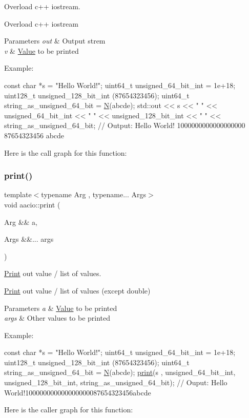 Overload c++ iostream. 

Overload c++ iostream 
\begin{DoxyParams}{Parameters}
{\em out} & Output strem \\
\hline
{\em v} & \mbox{\hyperlink{struct_value}{Value}} to be printed\\
\hline
\end{DoxyParams}
Example\+: 
\begin{DoxyCode}
\textcolor{keyword}{const} \textcolor{keywordtype}{char} *s = \textcolor{stringliteral}{"Hello World!"};
uint64\_t unsigned\_64\_bit\_int = 1e+18;
uint128\_t unsigned\_128\_bit\_int (87654323456);
uint64\_t string\_as\_unsigned\_64\_bit = \mbox{\hyperlink{group__types_gaf9c1edb0e0da55ec6ba09f32f6839529}{N}}(abcde);
std::out << s << \textcolor{stringliteral}{" "} << unsigned\_64\_bit\_int << \textcolor{stringliteral}{" "}  << unsigned\_128\_bit\_int << \textcolor{stringliteral}{" "} << 
      string\_as\_unsigned\_64\_bit;
\textcolor{comment}{// Output: Hello World! 1000000000000000000 87654323456 abcde}
\end{DoxyCode}
 Here is the call graph for this function\+:
\mbox{\label{group__console_cppapi_ga2780132b8484a2674ef9254699d12968}} 
\subsubsection{\texorpdfstring{print()}{print()}}
{\footnotesize\ttfamily template$<$typename Arg , typename... Args$>$ \\
void aacio\+::print (\begin{DoxyParamCaption}\item[{Arg \&\&}]{a,  }\item[{Args \&\&...}]{args }\end{DoxyParamCaption})}



\mbox{\hyperlink{struct_print}{Print}} out value / list of values. 

\mbox{\hyperlink{struct_print}{Print}} out value / list of values (except double) 
\begin{DoxyParams}{Parameters}
{\em a} & \mbox{\hyperlink{struct_value}{Value}} to be printed \\
\hline
{\em args} & Other values to be printed\\
\hline
\end{DoxyParams}
Example\+: 
\begin{DoxyCode}
\textcolor{keyword}{const} \textcolor{keywordtype}{char} *s = \textcolor{stringliteral}{"Hello World!"};
uint64\_t unsigned\_64\_bit\_int = 1e+18;
uint128\_t unsigned\_128\_bit\_int (87654323456);
uint64\_t string\_as\_unsigned\_64\_bit = \mbox{\hyperlink{group__types_gaf9c1edb0e0da55ec6ba09f32f6839529}{N}}(abcde);
\mbox{\hyperlink{print_8hpp_a291145c6469a570728575802ed6ad965}{print}}(s , unsigned\_64\_bit\_int, unsigned\_128\_bit\_int, string\_as\_unsigned\_64\_bit);
\textcolor{comment}{// Ouput: Hello World!100000000000000000087654323456abcde}
\end{DoxyCode}
 Here is the caller graph for this function\+:
